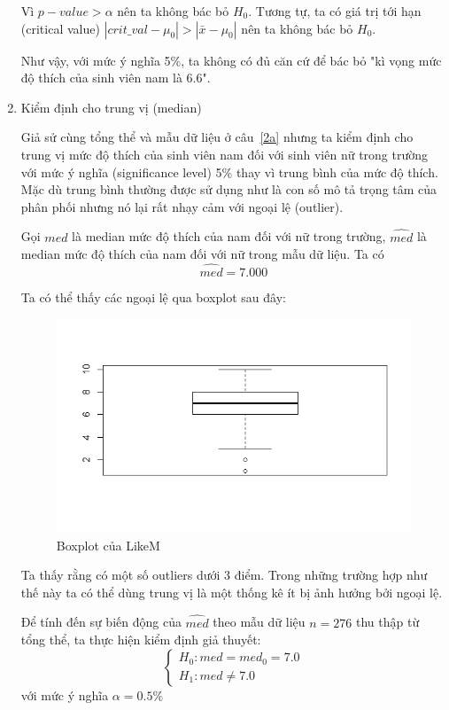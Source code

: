 \documentclass[a4paper,12pt]{article}
\begin{document}
\begin{enumerate}[label = \alph*)]
		Vì $p-value > \alpha$ nên ta không bác bỏ $H_0$. Tương tự, ta có giá trị tới hạn (critical value) $|crit\_val - \mu_0| > |\bar{x} - \mu_0|$ nên ta không bác bỏ $H_0$. 
		
		Như vậy, với mức ý nghĩa 5\%, ta không có đủ căn cứ để bác bỏ "kì vọng mức độ thích của sinh viên nam là $6.6$". 
		
		\item Kiểm định cho trung vị (median)
		
		Giả sử cùng tổng thể và mẫu dữ liệu ở câu~\ref{2a} nhưng ta kiểm định cho trung vị mức độ thích của sinh viên nam đối với sinh viên nữ trong trường với mức ý nghĩa (significance level) 5\% thay vì trung bình của mức độ thích. Mặc dù trung bình thường được sử dụng như là con số mô tả trọng tâm của phân phối nhưng nó lại rất nhạy cảm với ngoại lệ (outlier).
		
		Gọi $med$ là median mức độ thích của nam đối với nữ trong trường, $\hat{med}$ là median mức độ thích của nam đối với nữ trong mẫu dữ liệu. Ta có
		$$\hat{med} = 7.000$$
		
		Ta có thể thấy các ngoại lệ qua boxplot sau đây:
		\begin{figure}[H]
			\centering
			\includegraphics[width=0.7\linewidth]{Rplot1}
			\caption{Boxplot của LikeM}
			\label{fig:rplot1}
		\end{figure}
		
		Ta thấy rằng có một số outliers dưới 3 điểm. Trong những trường hợp như thế này ta có thể dùng trung vị là một thống kê ít bị ảnh hưởng bởi ngoại lệ.
		
		Để tính đến sự biến động của $\hat{med}$ theo mẫu dữ liệu $n = 276$ thu thập từ tổng thể, ta thực hiện kiểm định giả thuyết:
		\begin{equation*}
		\begin{cases}
		H_0: med = med_0 = 7.0\\
		H_1: med \neq 7.0
		\end{cases}
		\end{equation*}
		với mức ý nghĩa $\alpha = 0.5\%$
		

\end{enumerate}
\end{document}
